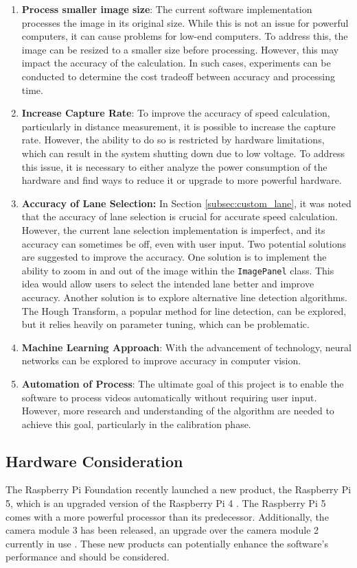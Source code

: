 \begin{enumerate}
    \item \textbf{Process smaller image size}: The current software implementation processes the image in its original size. While this is not an issue for powerful computers, it can cause problems for low-end computers. To address this, the image can be resized to a smaller size before processing. However, this may impact the accuracy of the calculation. In such cases, experiments can be conducted to determine the cost tradeoff between accuracy and processing time.
    \item \textbf{Increase Capture Rate}: To improve the accuracy of speed calculation, particularly in distance measurement, it is possible to increase the capture rate. However, the ability to do so is restricted by hardware limitations, which can result in the system shutting down due to low voltage. To address this issue, it is necessary to either analyze the power consumption of the hardware and find ways to reduce it or upgrade to more powerful hardware.
    \item \textbf{Accuracy of Lane Selection:} In Section \ref{subsec:custom_lane}, it was noted that the accuracy of lane selection is crucial for accurate speed calculation. However, the current lane selection implementation is imperfect, and its accuracy can sometimes be off, even with user input. Two potential solutions are suggested to improve the accuracy. One solution is to implement the ability to zoom in and out of the image within the \texttt{ImagePanel} class. This idea would allow users to select the intended lane better and improve accuracy. Another solution is to explore alternative line detection algorithms. The Hough Transform, a popular method for line detection, can be explored, but it relies heavily on parameter tuning, which can be problematic.
    \item \textbf{Machine Learning Approach}: With the advancement of technology, neural networks can be explored to improve accuracy in computer vision.
    \item \textbf{Automation of Process}: The ultimate goal of this project is to enable the software to process videos automatically without requiring user input. However, more research and understanding of the algorithm are needed to achieve this goal, particularly in the calibration phase.
\end{enumerate}

\subsection{Hardware Consideration}

The Raspberry Pi Foundation recently launched a new product, the Raspberry Pi 5, which is an upgraded version of the Raspberry Pi 4 \cite{RaspberryPi5}. The Raspberry Pi 5 comes with a more powerful processor than its predecessor. Additionally, the camera module 3 has been released, an upgrade over the camera module 2 currently in use \cite{picamera_2023}. These new products can potentially enhance the software's performance and should be considered.